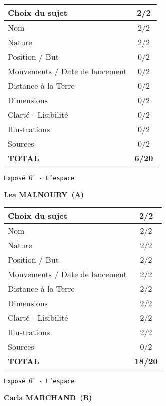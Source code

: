 	\vspace*{2cm}
	\begin{tabular}{|l|c|}
		\hline
		Choix du sujet & 2/2 \\
		\hline
		Nom & 2/2 \\
		\hline
		Nature & 2/2 \\
		\hline
		Position / But & 0/2 \\
		\hline
		Mouvements / Date de lancement & 0/2 \\
		\hline
		Distance \`a la Terre & 0/2 \\
		\hline
		Dimensions & 0/2 \\
		\hline
		Clart\'e - Lisibilit\'e & 0/2 \\
		\hline
		Illustrations & 0/2 \\
		\hline
		Sources & 0/2 \\
		\hline
		\textbf{TOTAL}  & \textbf{6/20} \\
		\hline
	\end{tabular}
	\newline
	\LARGE{\texttt{Expos\'e $6^e$ - L'espace}}
	\vspace*{1cm}

	\textbf{Lea MALNOURY\ (A)}

	\vspace*{2cm}
	\begin{tabular}{|l|c|}
		\hline
		Choix du sujet & 2/2 \\
		\hline
		Nom & 2/2 \\
		\hline
		Nature & 2/2 \\
		\hline
		Position / But & 2/2 \\
		\hline
		Mouvements / Date de lancement & 2/2 \\
		\hline
		Distance \`a la Terre & 2/2 \\
		\hline
		Dimensions & 2/2 \\
		\hline
		Clart\'e - Lisibilit\'e & 2/2 \\
		\hline
		Illustrations & 2/2 \\
		\hline
		Sources & 0/2 \\
		\hline
		\textbf{TOTAL}  & \textbf{18/20} \\
		\hline
	\end{tabular}
	\newline
	\LARGE{\texttt{Expos\'e $6^e$ - L'espace}}
	\vspace*{1cm}

	\textbf{Carla MARCHAND\ (B)}


